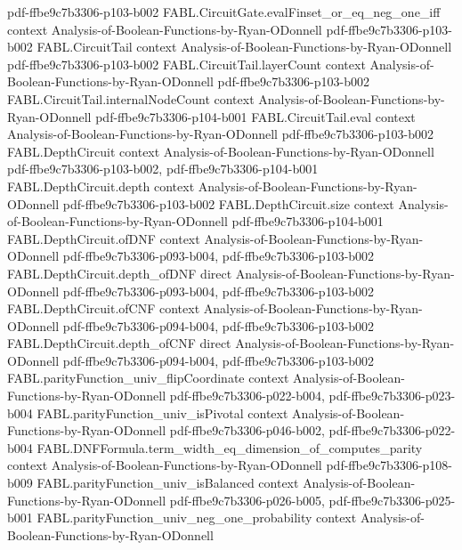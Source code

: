 \begin{theorem}
  {pdf-ffbe9c7b3306-p103-b002}
\proofstep
  {FABL.CircuitGate.evalFinset_or_eq_neg_one_iff}
  {context}
  {Analysis-of-Boolean-Functions-by-Ryan-ODonnell}
  {pdf-ffbe9c7b3306-p103-b002}
\proofstep
  {FABL.CircuitTail}
  {context}
  {Analysis-of-Boolean-Functions-by-Ryan-ODonnell}
  {pdf-ffbe9c7b3306-p103-b002}
\proofstep
  {FABL.CircuitTail.layerCount}
  {context}
  {Analysis-of-Boolean-Functions-by-Ryan-ODonnell}
  {pdf-ffbe9c7b3306-p103-b002}
\proofstep
  {FABL.CircuitTail.internalNodeCount}
  {context}
  {Analysis-of-Boolean-Functions-by-Ryan-ODonnell}
  {pdf-ffbe9c7b3306-p104-b001}
\proofstep
  {FABL.CircuitTail.eval}
  {context}
  {Analysis-of-Boolean-Functions-by-Ryan-ODonnell}
  {pdf-ffbe9c7b3306-p103-b002}
\proofstep
  {FABL.DepthCircuit}
  {context}
  {Analysis-of-Boolean-Functions-by-Ryan-ODonnell}
  {pdf-ffbe9c7b3306-p103-b002,
    pdf-ffbe9c7b3306-p104-b001}
\proofstep
  {FABL.DepthCircuit.depth}
  {context}
  {Analysis-of-Boolean-Functions-by-Ryan-ODonnell}
  {pdf-ffbe9c7b3306-p103-b002}
\proofstep
  {FABL.DepthCircuit.size}
  {context}
  {Analysis-of-Boolean-Functions-by-Ryan-ODonnell}
  {pdf-ffbe9c7b3306-p104-b001}
\proofstep
  {FABL.DepthCircuit.ofDNF}
  {context}
  {Analysis-of-Boolean-Functions-by-Ryan-ODonnell}
  {pdf-ffbe9c7b3306-p093-b004,
    pdf-ffbe9c7b3306-p103-b002}
\proofstep
  {FABL.DepthCircuit.depth_ofDNF}
  {direct}
  {Analysis-of-Boolean-Functions-by-Ryan-ODonnell}
  {pdf-ffbe9c7b3306-p093-b004,
    pdf-ffbe9c7b3306-p103-b002}
\proofstep
  {FABL.DepthCircuit.ofCNF}
  {context}
  {Analysis-of-Boolean-Functions-by-Ryan-ODonnell}
  {pdf-ffbe9c7b3306-p094-b004,
    pdf-ffbe9c7b3306-p103-b002}
\proofstep
  {FABL.DepthCircuit.depth_ofCNF}
  {direct}
  {Analysis-of-Boolean-Functions-by-Ryan-ODonnell}
  {pdf-ffbe9c7b3306-p094-b004,
    pdf-ffbe9c7b3306-p103-b002}
\proofstep
  {FABL.parityFunction_univ_flipCoordinate}
  {context}
  {Analysis-of-Boolean-Functions-by-Ryan-ODonnell}
  {pdf-ffbe9c7b3306-p022-b004,
    pdf-ffbe9c7b3306-p023-b004}
\proofstep
  {FABL.parityFunction_univ_isPivotal}
  {context}
  {Analysis-of-Boolean-Functions-by-Ryan-ODonnell}
  {pdf-ffbe9c7b3306-p046-b002,
    pdf-ffbe9c7b3306-p022-b004}
\proofstep
  {FABL.DNFFormula.term_width_eq_dimension_of_computes_parity}
  {context}
  {Analysis-of-Boolean-Functions-by-Ryan-ODonnell}
  {pdf-ffbe9c7b3306-p108-b009}
\proofstep
  {FABL.parityFunction_univ_isBalanced}
  {context}
  {Analysis-of-Boolean-Functions-by-Ryan-ODonnell}
  {pdf-ffbe9c7b3306-p026-b005,
    pdf-ffbe9c7b3306-p025-b001}
\proofstep
  {FABL.parityFunction_univ_neg_one_probability}
  {context}
  {Analysis-of-Boolean-Functions-by-Ryan-ODonnell}

\end{theorem}
